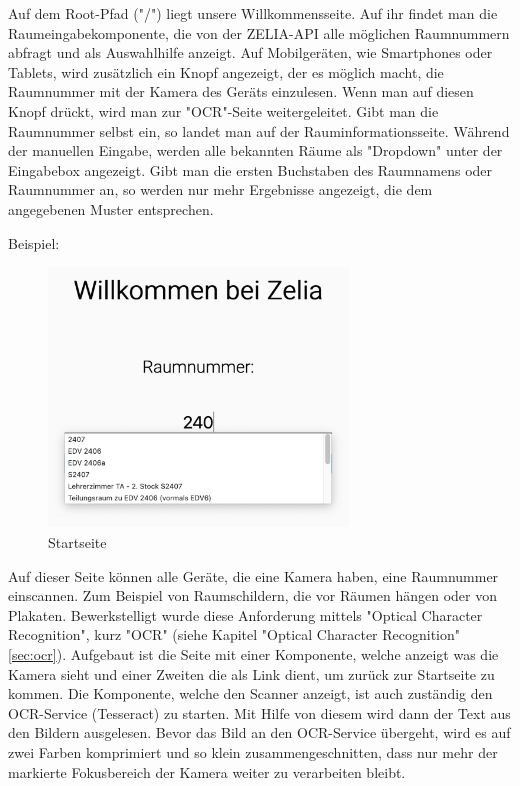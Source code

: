 \begin{minipage}{\textwidth}
    \label{sec:webcompstart}
    
    Auf dem Root-Pfad ("/") liegt unsere Willkommensseite. Auf ihr findet man die Raumeingabekomponente, die von der ZELIA-API alle möglichen Raumnummern abfragt und als Auswahlhilfe anzeigt. Auf Mobilgeräten, wie Smartphones oder Tablets, wird zusätzlich ein Knopf angezeigt, der es möglich macht, die Raumnummer mit der Kamera des Geräts einzulesen. Wenn man auf diesen Knopf drückt, wird man zur "OCR"-Seite weitergeleitet. Gibt man die Raumnummer selbst ein, so landet man auf der Rauminformationsseite. Während der manuellen Eingabe, werden alle bekannten Räume als "Dropdown" unter der Eingabebox angezeigt. Gibt man die ersten Buchstaben des Raumnamens oder Raumnummer an, so werden nur mehr Ergebnisse angezeigt, die dem angegebenen Muster entsprechen.
\end{minipage}

Beispiel:

\begin{figure}[H]
    \centering
    \includegraphics[width=80mm]{media/WebComponents/Startseite_light.png}
    \caption{Startseite}
    \label{fig:compinput}
\end{figure}



Auf dieser Seite können alle Geräte, die eine Kamera haben, eine Raumnummer einscannen. Zum Beispiel von Raumschildern, die vor Räumen hängen oder von Plakaten. Bewerkstelligt wurde diese Anforderung mittels "Optical Character Recognition", kurz "OCR" (siehe Kapitel "Optical Character Recognition" \ref{sec:ocr}). Aufgebaut ist die Seite mit einer Komponente, welche anzeigt was die Kamera sieht und einer Zweiten die als Link dient, um zurück zur Startseite zu kommen. Die Komponente, welche den Scanner anzeigt, ist auch zuständig den OCR-Service (Tesseract) zu starten. Mit Hilfe von diesem wird dann der Text aus den Bildern ausgelesen. Bevor das Bild an den OCR-Service übergeht, wird es auf zwei Farben komprimiert und so klein zusammengeschnitten, dass nur mehr der markierte Fokusbereich der Kamera weiter zu verarbeiten bleibt.

